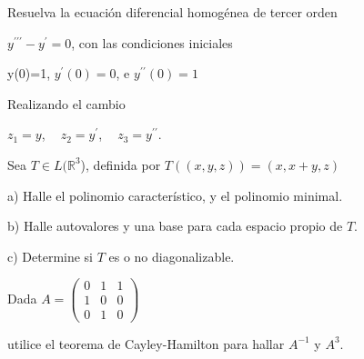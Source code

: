 \begin{exercise} 
\item

Resuelva la ecuación diferencial homogénea de tercer orden 

$y^{\prime\prime\prime}- y^{\prime} =0$, con las condiciones iniciales

y(0)=1, $ y^{\prime}(0)=0$, e $ y^{\prime\prime}(0)=1$

Realizando el cambio

$z_1=y$, $~~~~z_2=y^{\prime}$, $~~~~z_3=y^{\prime\prime}$.
\end{exercise} 


\begin{exercise} 
 
 \item

Sea $T \in L(\mathbb{R}^3$), definida  por $T((x,y,z))=(x,x+y,z)$ 

\bigskip


a) Halle el polinomio característico, y el polinomio minimal.

\bigskip

b) Halle autovalores y una base para cada espacio propio de $T$.

\bigskip

c) Determine si $T$ es o no diagonalizable.
 
\end{exercise} 


\bigskip
\begin{exercise} 
 \item
 
 Dada $A=\left(\begin{array}{ccc}0 & 1 & 1  \\1  & 0 & 0
\\ 0  & 1 & 0
\end{array}
 \right)$

 \bigskip

 
 
\noindent utilice el teorema de Cayley-Hamilton para hallar $A^{-1}$ y $A^3$.

 \end{exercise} 

